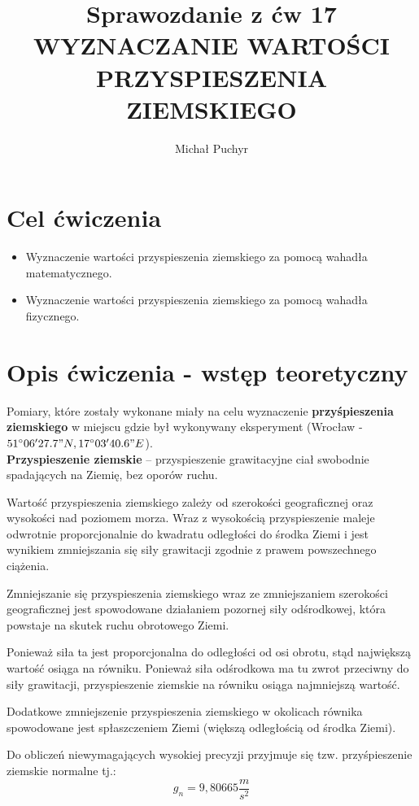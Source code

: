 \documentclass[12pt]{article}
\author{Michał Puchyr}
\title{Sprawozdanie z ćw 17 \\
WYZNACZANIE WARTOŚCI PRZYSPIESZENIA ZIEMSKIEGO}
\begin{document}
\maketitle

\section{Cel ćwiczenia}

\begin{itemize}
    \item Wyznaczenie wartości przyspieszenia ziemskiego za pomocą wahadła matematycznego.
    \item Wyznaczenie wartości przyspieszenia ziemskiego za pomocą wahadła fizycznego.
\end{itemize}

\section{Opis ćwiczenia - wstęp teoretyczny}

Pomiary, które zostały wykonane miały na celu wyznaczenie \textbf{przyśpieszenia ziemskiego} w miejscu
gdzie był wykonywany eksperyment (Wrocław - $51^{\circ}06'27.7" N, 17^{\circ}03'40.6" E$). \\

\textbf{Przyspieszenie ziemskie} -- przyspieszenie grawitacyjne ciał swobodnie spadających na Ziemię, bez oporów ruchu.

Wartość przyspieszenia ziemskiego zależy od szerokości geograficznej oraz wysokości nad poziomem morza. 
Wraz z wysokością przyspieszenie maleje odwrotnie proporcjonalnie do kwadratu odległości do środka Ziemi 
i jest wynikiem zmniejszania się siły grawitacji zgodnie z prawem powszechnego ciążenia. 

Zmniejszanie się przyspieszenia ziemskiego wraz ze zmniejszaniem szerokości geograficznej 
jest spowodowane działaniem pozornej siły odśrodkowej, która powstaje na skutek ruchu obrotowego Ziemi. 

Ponieważ siła ta jest proporcjonalna do odległości od osi obrotu, stąd największą wartość osiąga na równiku. 
Ponieważ siła odśrodkowa ma tu zwrot przeciwny do siły grawitacji, 
przyspieszenie ziemskie na równiku osiąga najmniejszą wartość. 

Dodatkowe zmniejszenie przyspieszenia ziemskiego w okolicach równika spowodowane jest spłaszczeniem Ziemi 
(większą odległością od środka Ziemi).

Do obliczeń niewymagających wysokiej precyzji przyjmuje się tzw. przyśpieszenie ziemskie normalne tj.:
$$ g_n = 9,80665 \frac{m}{s^2} $$
\end{document}
